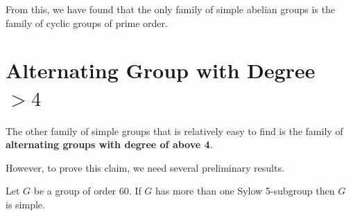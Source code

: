 From this, we have found that the only family of simple abelian groups is the family of cyclic groups of prime order.

\newpage

\section{Alternating Group with Degree \texorpdfstring{$>4$}{More Than 4}}
The other family of simple groups that is relatively easy to find is the family of \textbf{alternating groups with degree of above 4}.

However, to prove this claim, we need several preliminary results.

\begin{lemma}\label{lemma-group-of-order-60-with->1-sylow-5-subgroup-is-simple}
    Let $G$ be a group of order 60. If $G$ has more than one Sylow 5-subgroup then $G$ is simple.
\end{lemma}
